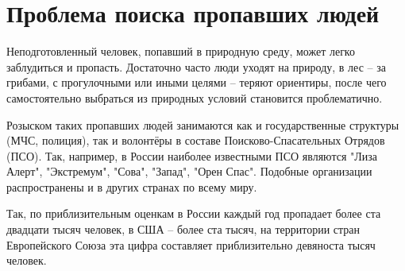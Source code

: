 \section{Проблема поиска пропавших людей}\label{sect-1}

Неподготовленный человек, попавший в природную среду, может легко заблудиться и пропасть. Достаточно часто люди уходят на природу, в лес -- за грибами, с прогулочными или иными целями -- теряют ориентиры, после чего самостоятельно выбраться из природных условий становится проблематично.

Розыском таких пропавших людей занимаются как и государственные структуры (МЧС, полиция), так и волонтёры в составе Поисково-Спасательных Отрядов (ПСО). Так, например, в России наиболее известными ПСО являются "Лиза Алерт", "Экстремум", "Сова", "Запад", "Орен Спас". Подобные организации распространены и в других странах по всему миру.

Так, по приблизительным оценкам в России каждый год пропадает более ста двадцати тысяч человек, в США -- более ста тысяч, на территории стран Европейского Союза эта цифра составляет приблизительно девяноста тысяч человек.





\clearpage
